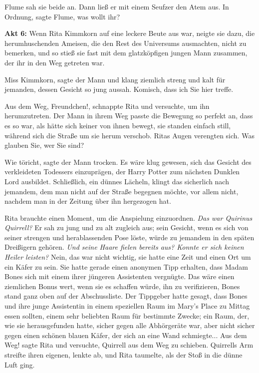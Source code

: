 Flume sah sie beide an. Dann ließ er mit einem Seufzer den Atem aus. \glqq{}In
Ordnung\grqq{}, sagte Flume, \glqq{}was wollt ihr?\grqq{}

\textbf{ Akt 6:} Wenn Rita Kimmkorn auf eine leckere Beute aus war, neigte sie
dazu, die herumhuschenden Ameisen, die den Rest des Universums ausmachten, nicht
zu bemerken, und so stieß sie fast mit dem glatzköpfigen jungen Mann zusammen,
der ihr in den Weg getreten war.

\glqq{}Miss Kimmkorn\grqq{}, sagte der Mann und klang ziemlich streng und kalt
für jemanden, dessen Gesicht so jung aussah. \glqq{}Komisch, dass ich Sie hier
treffe.\grqq{}

\glqq{}Aus dem Weg, Freundchen!\grqq{}, schnappte Rita und versuchte, um ihn
herumzutreten. Der Mann in ihrem Weg passte die Bewegung so perfekt an, dass es
so war, als hätte sich keiner von ihnen bewegt, sie standen einfach still,
während sich die Straße um sie herum verschob. Ritas Augen verengten sich. \glqq
Was glauben Sie, wer Sie sind?\grqq{}

\glqq{}Wie töricht\grqq{}, sagte der Mann trocken. \glqq{}Es wäre klug gewesen,
sich das Gesicht des verkleideten Todessers einzuprägen, der Harry Potter zum
nächsten Dunklen Lord ausbildet. Schließlich\grqq{}, ein dünnes Lächeln, \glqq
klingt das sicherlich nach jemandem, dem man nicht auf der Straße begegnen
möchte, vor allem nicht, nachdem man in der Zeitung über ihn hergezogen
hat.\grqq{}

Rita brauchte einen Moment, um die Anspielung einzuordnen.
\emph{Das war Quirinus Quirrell?}
Er sah zu jung und zu alt zugleich aus; sein Gesicht, wenn es sich von seiner
strengen und herablassenden Pose löste, würde zu jemandem in den späten
Dreißigern gehören.
\emph{Und seine Haare fielen bereits aus? Konnte er sich keinen Heiler leisten?}
Nein, das war nicht wichtig, sie hatte eine Zeit und einen Ort um ein Käfer zu
sein. Sie hatte gerade einen anonymen Tipp erhalten, dass Madam Bones sich mit
einem ihrer jüngeren Assistenten vergnügte. Das wäre einen ziemlichen Bonus
wert, wenn sie es schaffen würde, ihn zu verifizieren, Bones stand ganz oben auf
der Abschussliste. Der Tippgeber hatte gesagt, dass Bones und ihre junge
Assistentin in einem speziellen Raum im Mary's Place zu Mittag essen sollten,
einem sehr beliebten Raum für bestimmte Zwecke; ein Raum, der, wie sie
herausgefunden hatte, sicher gegen alle Abhörgeräte war, aber nicht sicher gegen
einen schönen blauen Käfer, der sich an eine Wand schmiegte... \glqq{}Aus dem
Weg!\grqq{} sagte Rita und versuchte, Quirrell aus dem Weg zu schieben.
Quirrells Arm streifte ihren eigenen, lenkte ab, und Rita taumelte, als der Stoß
in die dünne Luft ging.

